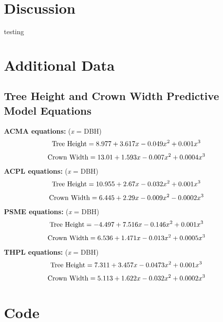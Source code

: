 \documentclass[12pt,twoside]{reedthesis}
\begin{document}
\hypertarget{discussion}{%
\chapter{Discussion}\label{discussion}}

testing

\appendix

\hypertarget{data}{%
\chapter{Additional Data}\label{data}}

\hypertarget{tree-model-eqs}{%
\section{Tree Height and Crown Width Predictive Model Equations}\label{tree-model-eqs}}

\textbf{ACMA equations:} (\textit{x} = DBH)
\begin{equation}
\textrm{Tree Height} = 8.977 + 3.617x -0.049x^{2} + 0.001x^{3}  \\
\end{equation}
\begin{equation}
\textrm{Crown Width} = 13.01 + 1.593x - 0.007x^{2} + 0.0004x^{3} \\
\end{equation}
\textbf{ACPL equations:} (\textit{x} = DBH)
\begin{equation}
\textrm{Tree Height} = 10.955+ 2.67x -0.032x^2 + 0.001x^3  \\
\end{equation}
\begin{equation}
\textrm{Crown Width} = 6.445 + 2.29x - 0.009x^2 - 0.0002x^3 \\
\end{equation}
\textbf{PSME equations:} (\textit{x} = DBH)
\begin{equation}
\textrm{Tree Height} = -4.497 + 7.516x - 0.146x^2 + 0.001x^3 \\
\end{equation}
\begin{equation}
\textrm{Crown Width} = 6.536 + 1.471x - 0.013x^2 + 0.0005x^3 \\
\end{equation}
\textbf{THPL equations:} (\textit{x} = DBH)
\begin{equation}
\textrm{Tree Height} = 7.311 + 3.457x - 0.0473x^2 + 0.001x^3 \\
\end{equation}
\begin{equation}
\textrm{Crown Width} = 5.113 + 1.622x - 0.032x^2 + 0.0002x^3 \\
\end{equation}
\hypertarget{code-chunks}{%
\chapter{Code}\label{code-chunks}}
\end{document}

